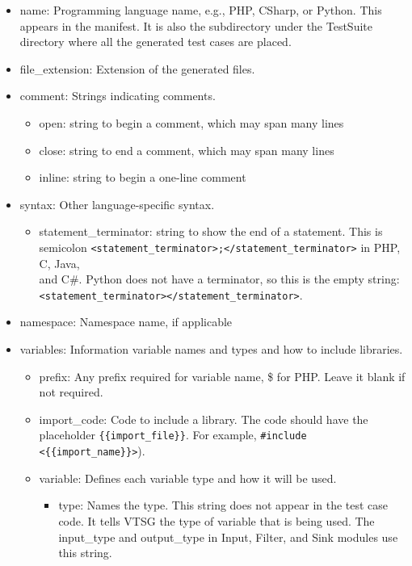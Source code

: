 \documentclass[12pt]{article}
\newcommand{\CSharp}{C{\fontseries{b}\selectfont\#}}
\begin{document}
\begin{itemize}
    \item name: Programming language name, e.g., PHP, CSharp, 
    or Python. This appears in the manifest.
    It is also the subdirectory under the TestSuite directory 
    where all the generated test cases are placed.

    \item file\_extension: Extension of the generated files.

    \item comment: Strings indicating comments.
    \begin{itemize}
        \item open: string to begin a comment, which may span many lines
        \item close: string to end a comment, which may span many lines
        \item inline: string to begin a one-line comment
    \end{itemize}
    
    \item syntax: Other language-specific syntax.
    \begin{itemize}
        \item statement\_terminator: string to show the end of 
        a statement.
        This is semicolon
        \verb|<statement_terminator>;</statement_terminator>|
        in PHP, C, Java, \\ and \CSharp. Python does not have 
        a terminator, so this is the empty string: \\
        \verb|<statement_terminator></statement_terminator>|.
    \end{itemize}
    
    \item namespace: Namespace name, if applicable

    \item variables: Information variable names and types and how
    to include libraries.
    \begin{itemize}
        \item prefix: Any prefix required for variable name, 
        \$ for PHP.
        Leave it blank if not required.

        \item import\_code: Code to include a library. The code
        should have the placeholder \verb|{{import_file}}|.
        For example, \verb|#include <{{import_name}}>|).
        
        \item variable: Defines each variable type and how it will 
        be used.
        \begin{itemize}
        \item type: Names the type. This string 
        does not appear in the test case code.  It tells VTSG
        the type of variable that is being used.  The input\_type
        and output\_type in Input, Filter, and Sink modules use
        this string.


\end{itemize}
\end{itemize}
\end{itemize}
\end{document}
